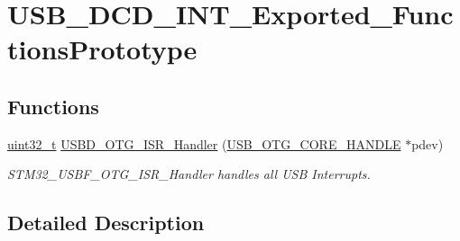 \hypertarget{group___u_s_b___d_c_d___i_n_t___exported___functions_prototype}{\section{U\-S\-B\-\_\-\-D\-C\-D\-\_\-\-I\-N\-T\-\_\-\-Exported\-\_\-\-Functions\-Prototype}
\label{group___u_s_b___d_c_d___i_n_t___exported___functions_prototype}
}
\subsection*{Functions}
\begin{DoxyCompactItemize}
\item 
\hyperlink{stdint_8h_a435d1572bf3f880d55459d9805097f62}{uint32\-\_\-t} \hyperlink{group___u_s_b___d_c_d___i_n_t___exported___functions_prototype_ga5d20d4901254494cc809943071149dfa}{U\-S\-B\-D\-\_\-\-O\-T\-G\-\_\-\-I\-S\-R\-\_\-\-Handler} (\hyperlink{group___u_s_b___c_o_r_e___exported___types_gaf76054c11eb8a3367907aad7ae700e80}{U\-S\-B\-\_\-\-O\-T\-G\-\_\-\-C\-O\-R\-E\-\_\-\-H\-A\-N\-D\-L\-E} $\ast$pdev)
\begin{DoxyCompactList}\small\item\em S\-T\-M32\-\_\-\-U\-S\-B\-F\-\_\-\-O\-T\-G\-\_\-\-I\-S\-R\-\_\-\-Handler handles all U\-S\-B Interrupts. \end{DoxyCompactList}\end{DoxyCompactItemize}


\subsection{Detailed Description}


